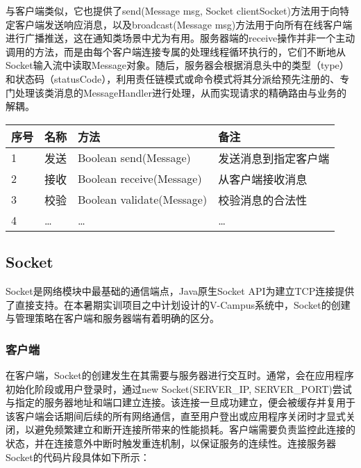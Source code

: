 \documentclass[a4paper]{ctexart}
\begin{document}
与客户端类似，它也提供了send(Message msg, Socket clientSocket)方法用于向特定客户端发送响应消息，以及broadcast(Message msg)方法用于向所有在线客户端进行广播推送，这在通知类场景中尤为有用。服务器端的receive操作并非一个主动调用的方法，而是由每个客户端连接专属的处理线程循环执行的，它们不断地从Socket输入流中读取Message对象。随后，服务器会根据消息头中的类型（type）和状态码（statusCode），利用责任链模式或命令模式将其分派给预先注册的、专门处理该类消息的MessageHandler进行处理，从而实现请求的精确路由与业务的解耦。
\begin{tabular}{llll}
    \toprule
    \textbf{序号} & \textbf{名称} & \textbf{方法}               & \textbf{备注} \\
    \midrule
    1           & 发送          & Boolean send(Message)     & 发送消息到指定客户端  \\
    2           & 接收          & Boolean receive(Message)  & 从客户端接收消息    \\
    3           & 校验          & Boolean validate(Message) & 校验消息的合法性    \\
    4           & …           & …                         & …           \\
    \bottomrule
\end{tabular}

\subsection{Socket}
Socket是网络模块中最基础的通信端点，Java原生Socket API为建立TCP连接提供了直接支持。在本暑期实训项目之中计划设计的V-Campus系统中，Socket的创建与管理策略在客户端和服务器端有着明确的区分。
\subsubsection{客户端}
在客户端，Socket的创建发生在其需要与服务器进行交互时。通常，会在应用程序初始化阶段或用户登录时，通过new Socket(SERVER_IP, SERVER_PORT)尝试与指定的服务器地址和端口建立连接。该连接一旦成功建立，便会被缓存并复用于该客户端会话期间后续的所有网络通信，直至用户登出或应用程序关闭时才显式关闭，以避免频繁建立和断开连接所带来的性能损耗。客户端需要负责监控此连接的状态，并在连接意外中断时触发重连机制，以保证服务的连续性。连接服务器Socket的代码片段具体如下所示：

\begin{comment}
\begin{lstlisting}
// 连接服务器Socket
clientSocket = new Socket(SERVER_ADDRESS, SERVER_PORT);
\end{lstlisting}
\end{comment}
\end{document}
